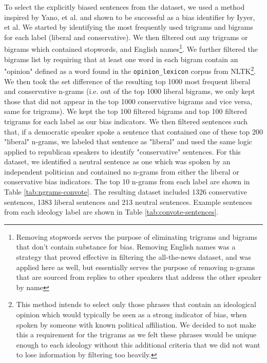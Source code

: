 \documentclass[10pt,a4paper,onecolumn]{article}
\begin{document}
To select the explicitly biased sentences from the dataset, we used a method inspired by Yano, et al. \cite{YanoBigrams} and shown to be successful as a bias identifier by Iyyer, et al. We started by identifying the most frequently used trigrams and bigrams for each label (liberal and conservative). We then filtered out any trigrams or bigrams which contained stopwords, and English names\footnote{Removing stopwords serves the purpose of eliminating trigrams and bigrams that don't contain substance for bias. Removing English names was a strategy that proved effective in filtering the all-the-news dataset, and was applied here as well, but essentially serves the purpose of removing n-grams that are sourced from replies to other speakers that address the other speaker by name}. We further filtered the bigrams list by requiring that at least one word in each bigram contain an "opinion" defined as a word found in the \texttt{opinion\_lexicon} corpus from NLTK\footnote{This method intends to select only those phrases that contain an ideological opinion which would typically be seen as a strong indicator of bias, when spoken by someone with known political affiliation. We decided to not make this a requirement for the trigrams as we felt these phrases would be unique enough to each ideology without this additional criteria that we did not want to lose information by filtering too heavily.}. We then took the set difference of the resulting top 1000 most frequent liberal and conservative n-grams (i.e. out of the top 1000 liberal bigrams, we only kept those that did not appear in the top 1000 conservative bigrams and vice versa, same for trigrams). We kept the top 100 filtered bigrams and top 100 filtered trigrams for each label as our bias indicators. We then filtered sentences such that, if a democratic speaker spoke a sentence that contained one of these top 200 "liberal" n-grams, we labeled that sentence as "liberal" and used the same logic applied to republican speakers to identify "conservative" sentences. For this dataset, we identified a neutral sentence as one which was spoken by an independent politician and contained no n-grams from either the liberal or conservative bias indicators. The top 10 n-grams from each label are shown in Table \ref{tab:ngrams-convote}. The resulting dataset included 1326 conservative sentences, 1383 liberal sentences and 213 neutral sentences. Example sentences from each ideology label are shown in Table \ref{tab:convote-sentences}.
\end{document}
